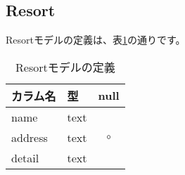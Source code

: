 \documentclass[a4j,titlepage]{jarticle}
\begin{document}
\subsection{Resort}
Resortモデルの定義は、表\ref{resort}の通りです。

\begin{table}[!htbp]
\caption{Resortモデルの定義}
\label{resort}
\small
\begin{center}
\begin{tabular}{|l|l|c|}\hline
カラム名 & 型 & null \\\hline\hline
name & text & \\\hline
address & text & $\circ$ \\\hline
detail & text & \\\hline
\end{tabular}
\end{center}
\end{table}
\end{document}
